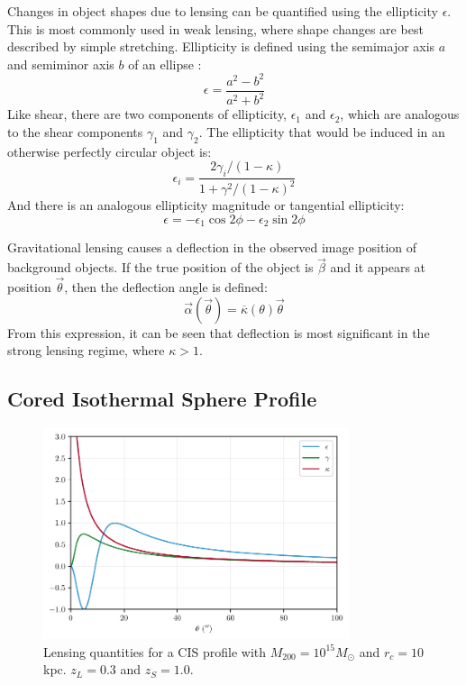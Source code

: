 \documentclass[10pt]{article}
\begin{document}
Changes in object shapes due to lensing can be quantified using the ellipticity $\epsilon$. This is most commonly used in weak lensing, where shape changes are best described by simple stretching. Ellipticity is defined using the semimajor axis $a$ and semiminor axis $b$ of an ellipse \citep{Narayan1996}:
\begin{equation}
\epsilon = \frac{a^2 - b^2}{a^2 + b^2}
\end{equation}
Like shear, there are two components of ellipticity, $\epsilon_1$ and $\epsilon_2$, which are analogous to the shear components $\gamma_1$ and $\gamma_2$. The ellipticity that would be induced in an otherwise perfectly circular object is:
\begin{equation} \label{ellipticity}
\epsilon_i = \frac{2 \gamma_i/(1 - \kappa)}{1 + \gamma^2/(1 - \kappa)^2}
\end{equation}
And there is an analogous ellipticity magnitude or tangential ellipticity:
\begin{equation}
\epsilon =  -\epsilon_1 \cos{2\phi} -\epsilon_2 \sin{2\phi}
\end{equation}

Gravitational lensing causes a deflection in the observed image position of background objects. If the true position of the object is $\vec{\beta}$ and it appears at position $\vec{\theta}$, then the deflection angle is defined:
\begin{equation}
\vec{\alpha}(\vec{\theta}) = \overline{\kappa}(\theta)\vec{\theta}
\end{equation}
From this expression, it can be seen that deflection is most significant in the strong lensing regime, where $\kappa > 1$.


\subsection{Cored Isothermal Sphere Profile}

\begin{figure}
    \centering
    \includegraphics[width=0.8\textwidth]{isothermalproperties.pdf}
    \caption{Lensing quantities for a CIS profile with $M_{200} = 10^{15} M_\odot$ and $r_c = 10$ kpc. $z_L = 0.3$ and $z_S = 1.0$.}
    \label{cisproperties}
\end{figure}
\end{document}
